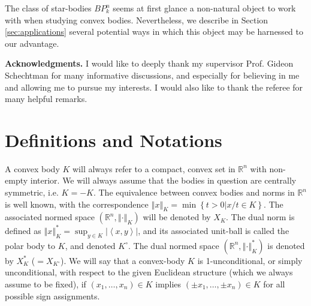 \documentclass[12pt,oneside]{amsart}
\theoremstyle{definition}
\theoremstyle{remark}
\theoremstyle{proof}
\numberwithin{equation}{section}
\newcommand{\norm}[1]{\left\Vert#1\right\Vert}
\newcommand{\abs}[1]{\left\vert#1\right\vert}
\newcommand{\set}[1]{\left\{#1\right\}}
\newcommand{\scalar}[1]{\left \langle #1 \right \rangle}
\newcommand{\Real}{\mathbb{R}}
\newcommand{\BP}{BP}
\begin{document}
The class of star-bodies $\BP_k^n$ seems at first glance a
non-natural object to work with when studying convex bodies.
Nevertheless, we describe in Section \ref{sec:applications}
several potential ways in which this object may be harnessed to
our advantage.

%

\medskip

\noindent \textbf{Acknowledgments.} I would like to deeply thank
my supervisor Prof. Gideon Schechtman for many informative
discussions, and especially for believing in me and allowing me to
pursue my interests. I would also like to thank the referee for
many helpful remarks.

\section{Definitions and Notations} \label{sec:definitions}

A convex body $K$ will always refer to a compact, convex set in
$\Real^n$ with non-empty interior. We will always assume that the
bodies in question are centrally symmetric, i.e. $K=-K$. The
equivalence between convex bodies and norms in $\Real^n$ is well
known, with the correspondence $\norm{x}_K = \min \set{t>0 | x/t
\in K}$. The associated normed space $(\Real^n,\norm{\cdot}_K)$
will be denoted by $X_K$. The dual norm is defined as
$\norm{x}^*_K = \sup_{y \in K} \abs{\scalar{x,y}}$, and its
associated unit-ball is called the polar body to $K$, and denoted
$K^\circ$. The dual normed space $(\Real^n,\norm{\cdot}^*_K)$ is
denoted by $X^*_K$ ($= X_{K^\circ}$). We will say that a
convex-body $K$ is 1-unconditional, or simply unconditional, with
respect to the given Euclidean structure (which we always assume
to be fixed), if $(x_1,\ldots,x_n) \in K$ implies $(\pm x_1,
\ldots, \pm x_n) \in K$ for all possible sign assignments.
\end{document}
